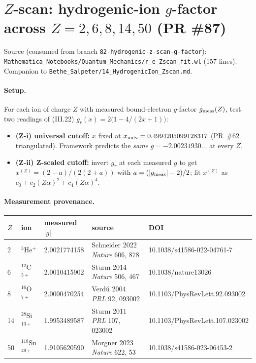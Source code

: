 \section{$Z$-scan: hydrogenic-ion $g$-factor across $Z = 2, 6, 8, 14, 50$ (PR \#87)}
\label{sec:eq-zscan-fit}

Source (consumed from branch \texttt{82-hydrogenic-z-scan-g-factor}):
\texttt{Mathematica\_Notebooks/Quantum\_Mechanics/r\_e\_Zscan\_fit.wl}
(157 lines).
Companion to
\texttt{Bethe\_Salpeter/14\_HydrogenicIon\_Zscan.md}.

\paragraph{Setup.}
For each ion of charge $Z$ with measured bound-electron $g$-factor
$g_{\rm meas}(Z)$, test two readings of (III.22)
$g_r(x) = 2\bigl(1 - 4/(2x + 1)\bigr)$:
\begin{itemize}[topsep=2pt,itemsep=0pt]
  \item \textbf{(Z-i) universal cutoff:} $x$ fixed at $x_{\rm univ} =
        0.4994205099128317$ (PR~\#62 triangulated). Framework predicts the
        \emph{same} $g = -2.00231930\dots$ at every $Z$.
  \item \textbf{(Z-ii) Z-scaled cutoff:} invert $g_r$ at each measured $g$
        to get $x^{(Z)} = (2 - a)/(2(2 + a))$ with $a = (|g_{\rm meas}| - 2)/2$;
        fit $x^{(Z)}$ as $c_0 + c_2 (Z\alpha)^2 + c_4 (Z\alpha)^4$.
\end{itemize}

\paragraph{Measurement provenance.}
\begin{center}
\begin{tabular}{lllll}
\toprule
$Z$ & ion             & measured $|g|$ & source                  & DOI \\
\midrule
2  & $^3$He$^+$       & 2.0021774158  & Schneider 2022 \emph{Nature} 606, 878 & 10.1038/s41586-022-04761-7 \\
6  & $^{12}$C$^{5+}$  & 2.0010415902  & Sturm 2014 \emph{Nature} 506, 467     & 10.1038/nature13026 \\
8  & $^{16}$O$^{7+}$  & 2.0000470254  & Verd\'u 2004 \emph{PRL} 92, 093002    & 10.1103/PhysRevLett.92.093002 \\
14 & $^{28}$Si$^{13+}$& 1.9953489587  & Sturm 2011 \emph{PRL} 107, 023002     & 10.1103/PhysRevLett.107.023002 \\
50 & $^{118}$Sn$^{49+}$& 1.9105620590 & Morgner 2023 \emph{Nature} 622, 53    & 10.1038/s41586-023-06453-2 \\
\bottomrule
\end{tabular}
\end{center}


